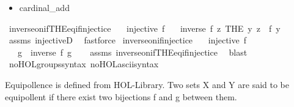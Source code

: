 \begin{isabellebody}
\begin{isamarkuptext}
\begin{itemize}
\item cardinal\_add%
\end{itemize}%
\end{isamarkuptext}\isamarkuptrue%
\isamarkupfalse%
\ inverse{\isacharunderscore}{\kern0pt}on{\isacharunderscore}{\kern0pt}if{\isacharunderscore}{\kern0pt}THE{\isacharunderscore}{\kern0pt}eq{\isacharunderscore}{\kern0pt}if{\isacharunderscore}{\kern0pt}injectice{\isacharcolon}{\kern0pt}\isanewline
\ \ \ {\isachardoublequoteopen}injective\ f{\isachardoublequoteclose}\isanewline
\ \ \ {\isachardoublequoteopen}inverse\ f\ {\isacharparenleft}{\kern0pt}{\isasymlambda}z{\isachardot}{\kern0pt}\ THE\ y{\isachardot}{\kern0pt}\ z\ {\isacharequal}{\kern0pt}\ f\ y{\isacharparenright}{\kern0pt}{\isachardoublequoteclose}\isanewline
%
\isadelimproof
\ \ %
\endisadelimproof
%
\isatagproof
{}\isamarkupfalse%
\ assms\ injectiveD\ \isamarkupfalse%
\ fastforce%
\endisatagproof
{\isafoldproof}%
%
\isadelimproof
\isanewline
%
\endisadelimproof
\isanewline
{}\isamarkupfalse%
\ inverse{\isacharunderscore}{\kern0pt}on{\isacharunderscore}{\kern0pt}if{\isacharunderscore}{\kern0pt}injectice{\isacharcolon}{\kern0pt}\isanewline
\ \ \ {\isachardoublequoteopen}injective\ f{\isachardoublequoteclose}\isanewline
\ \ \ g\ \ {\isachardoublequoteopen}inverse\ f\ g{\isachardoublequoteclose}\isanewline
%
\isadelimproof
\ \ %
\endisadelimproof
%
\isatagproof
{}\isamarkupfalse%
\ assms\ inverse{\isacharunderscore}{\kern0pt}on{\isacharunderscore}{\kern0pt}if{\isacharunderscore}{\kern0pt}THE{\isacharunderscore}{\kern0pt}eq{\isacharunderscore}{\kern0pt}if{\isacharunderscore}{\kern0pt}injectice\ \isamarkupfalse%
\ blast%
\endisatagproof
{\isafoldproof}%
%
\isadelimproof
\isanewline
%
\endisadelimproof
\isanewline
{}\isamarkupfalse%
\ no{\isacharunderscore}{\kern0pt}HOL{\isacharunderscore}{\kern0pt}groups{\isacharunderscore}{\kern0pt}syntax\ no{\isacharunderscore}{\kern0pt}HOL{\isacharunderscore}{\kern0pt}ascii{\isacharunderscore}{\kern0pt}syntax%
\isadelimdocument
%
\endisadelimdocument
%
\isatagdocument
%
\isamarkuptrue%
%
\endisatagdocument
{\isafolddocument}%
%
\isadelimdocument
%
\endisadelimdocument
%
\begin{isamarkuptext}%
Equipollence is defined from HOL-Library. Two sets X and Y are said to be equipollent if there 
exist two bijections f and g between them.%

\end{isamarkuptext}
\end{isabellebody}
